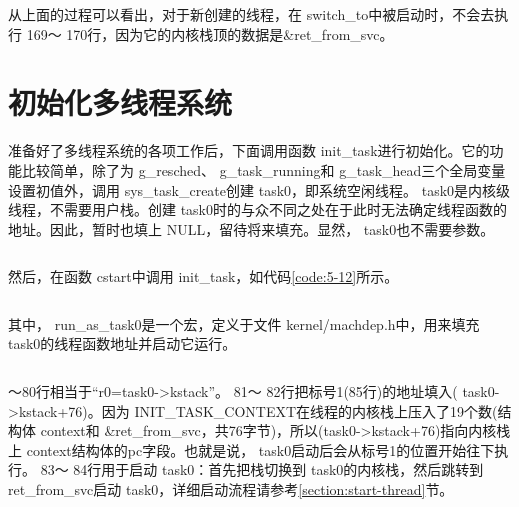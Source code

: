 \documentclass[main.tex]{subfiles}
\begin{document}
\begin{CJK*}{UTF8}{song}
\par
从上面的过程可以看出，对于新创建的线程，在 switch\_\-to中被启动时，不会去执行 169～ 170行，因为它的内核栈顶的数据是\&ret\_\-from\_\-svc。

\section{初始化多线程系统}
准备好了多线程系统的各项工作后，下面调用函数 init\_\-task进行初始化。它的功能比较简单，除了为 g\_\-resched、 g\_\-task\_\-running和 g\_\-task\_\-head三个全局变量设置初值外，调用 sys\_\-task\_\-create创建 task0，即系统空闲线程。 task0是内核级线程，不需要用户栈。创建 task0时的与众不同之处在于此时无法确定线程函数的地址。因此，暂时也填上 NULL，留待将来填充。显然， task0也不需要参数。

\begin{code}
\label{code:5-11}
\inputminted[firstline=290,lastline=306,linenos,numbersep=5pt,frame=lines,framesep=2mm]{c}{src/chapter05/kernel/task.c}
\end{code}

\noindent
然后，在函数 cstart中调用 init\_\-task，如代码\ref{code:5-12}所示。

\begin{code}
\label{code:5-12}
\inputminted[firstline=491,lastline=502,linenos,numbersep=5pt,frame=lines,framesep=2mm]{c}{src/chapter05/kernel/machdep.c}
\end{code}

\noindent
其中， run\_\-as\_\-task0是一个宏，定义于文件 kernel\-/\-machdep.h中，用来填充 task0的线程函数地址并启动它运行。

\begin{code}
\label{code:5-13}
\inputminted[firstline=76,lastline=89,linenos,numbersep=5pt,frame=lines,framesep=2mm]{c}{src/chapter05/kernel/machdep.h}
\end{code}

～80行相当于“r0=task0-\textgreater kstack”。 81～ 82行把标号1(85行)的地址填入( task0-\textgreater kstack+76)。因为 INIT\_\-TASK\_\-CONTEXT在线程的内核栈上压入了19个数(结构体 context和 \&ret\_\-from\_\-svc，共76字节)，所以(task0-\textgreater kstack+76)指向内核栈上 context结构体的pc字段。也就是说， task0启动后会从标号1的位置开始往下执行。 83～ 84行用于启动 task0：首先把栈切换到 task0的内核栈，然后跳转到 ret\_\-from\_\-svc启动 task0，详细启动流程请参考\ref{section:start-thread}节。


\end{CJK*}
\end{document}
